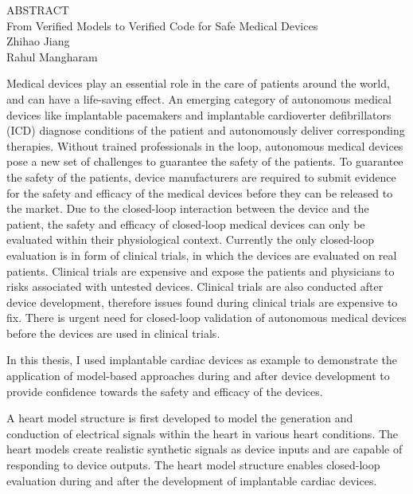 \documentclass[12pt,letterpaper]{report}
\theoremstyle{definition}
\theoremstyle{remark}
\numberwithin{equation}{chapter}
\theoremstyle{plain} %
\def\thetitle{From Verified Models to Verified Code for Safe Medical Devices}
\begin{document}
\newpage
{}
{}
\begin{center}
ABSTRACT\\
$ $\\
\thetitle\\
$ $\\
Zhihao Jiang\\
Rahul Mangharam\\
\end{center}
\noindent Medical devices play an essential role in the care of patients around the world, and can have a life-saving effect.
An emerging category of autonomous medical devices like implantable pacemakers and implantable cardioverter defibrillators (ICD) diagnose conditions of the patient and autonomously deliver corresponding therapies.
Without trained professionals in the loop, autonomous medical devices pose a new set of challenges to guarantee the safety of the patients.
To guarantee the safety of the patients, device manufacturers are required to submit evidence for the safety and efficacy of the medical devices before they can be released to the market.
Due to the closed-loop interaction between the device and the patient, the safety and efficacy of closed-loop medical devices can only be evaluated within their physiological context.
Currently the only closed-loop evaluation is in form of clinical trials, in which the devices are evaluated on real patients.
Clinical trials are expensive and expose the patients and physicians to risks associated with untested devices.
Clinical trials are also conducted after device development, therefore issues found during clinical trials are expensive to fix.
There is urgent need for closed-loop validation of autonomous medical devices before the devices are used in clinical trials.

In this thesis, I used implantable cardiac devices as example to demonstrate the application of model-based approaches during and after device development to provide confidence towards the safety and efficacy of the devices.

A heart model structure is first developed to model the generation and conduction of electrical signals within the heart in various heart conditions. 
The heart models create realistic synthetic signals as device inputs and are capable of responding to device outputs.
The heart model structure enables closed-loop evaluation during and after the development of implantable cardiac devices.
\end{document}
